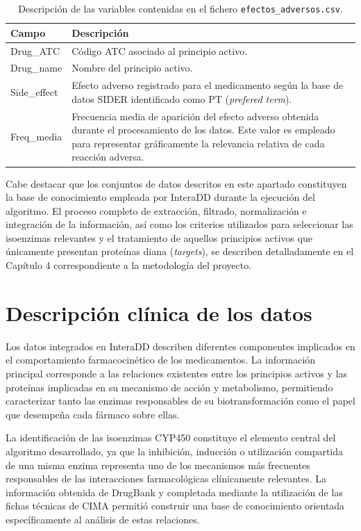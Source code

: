 \begin{table}[h]
\centering
\begin{tabularx}{\textwidth}{lX}
\toprule
\textbf{Campo} & \textbf{Descripción} \\
\midrule
Drug\_ATC & Código ATC asociado al principio activo.\\

Drug\_name & Nombre del principio activo.\\

Side\_effect & Efecto adverso registrado para el medicamento según la base de datos SIDER identificado como PT (\textit{prefered term}).\\

Freq\_media & Frecuencia media de aparición del efecto adverso obtenida durante el procesamiento de los datos. Este valor es empleado para representar gráficamente la relevancia relativa de cada reacción adversa.\\

\bottomrule
\end{tabularx}
\caption{Descripción de las variables contenidas en el fichero \texttt{efectos\_adversos.csv}.}
\label{tab:ea_csv}
\end{table}


Cabe destacar que los conjuntos de datos descritos en este apartado constituyen la base de conocimiento empleada por InteraDD durante la ejecución del algoritmo. El proceso completo de extracción, filtrado, normalización e integración de la información, así como los criterios utilizados para seleccionar las isoenzimas relevantes y el tratamiento de aquellos principios activos que únicamente presentan proteínas diana (\textit{targets}), se describen detalladamente en el Capítulo 4 correspondiente a la metodología del proyecto.

\section{Descripción clínica de los datos}

Los datos integrados en InteraDD describen diferentes componentes implicados en el comportamiento farmacocinético de los medicamentos. La información principal corresponde a las relaciones existentes entre los principios activos y las proteínas implicadas en su mecanismo de acción y metabolismo, permitiendo caracterizar tanto las enzimas responsables de su biotransformación como el papel que desempeña cada fármaco sobre ellas.

La identificación de las isoenzimas CYP450 constituye el elemento central del algoritmo desarrollado, ya que la inhibición, inducción o utilización compartida de una misma enzima representa uno de los mecanismos más frecuentes responsables de las interacciones farmacológicas clínicamente relevantes. La información obtenida de DrugBank y completada mediante la utilización de las fichas técnicas de CIMA permitió construir una base de conocimiento orientada específicamente al análisis de estas relaciones.

